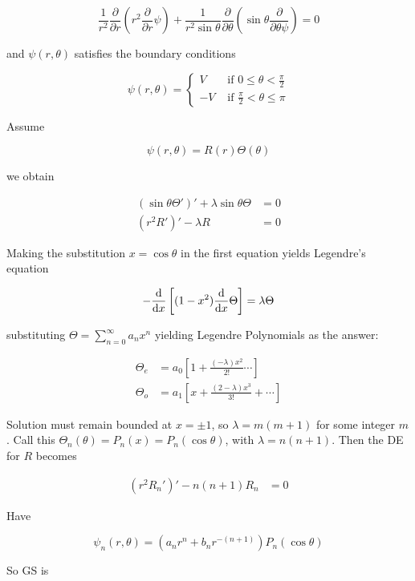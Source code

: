\documentclass[a4paper]{article}
\begin{document}
\[ \frac{1}{r^{2}} \frac{\partial }{\partial r} \left(  r^{2}  \frac{\partial }{\partial r} \psi     \right) + \frac{1}{r^{2} \sin \theta}  \frac{\partial }{\partial \theta} \left(  \sin \theta \frac{\partial }{\partial \theta \psi }   \right) = 0    \]

and $ \psi(r,\theta) $ satisfies the boundary conditions

\[ \psi(r,\theta) = \begin{cases} V  & \text{ if } 0 \leq \theta < \frac{\pi}{2} \\ -V & \text{ if } \frac{\pi}{2} < \theta \leq \pi \end{cases} \]

Assume 

\[ \psi(r,\theta) = R(r) \Theta(\theta) \]

we obtain 

\begin{align*}
(\sin \theta \Theta'  )' + \lambda \sin \theta \Theta & = 0 \\
 (r^{2} R' )' - \lambda R & = 0 
\end{align*}

Making the substitution $ x = \cos \theta $ in the first equation yields Legendre's equation

\[ - \frac{\mathrm{d} }{\mathrm{d} x}  \left[   (1-x^{2}) \frac{\mathrm{d} }{\mathrm{d} x}  \Theta \right]   = \lambda \Theta \]

substituting  $ \Theta = \sum_{n=0}^{\infty} a_{n} x^{n}  $ yielding Legendre Polynomials as the answer:

\begin{align*}
\Theta_{e} & = a_{0}  \left[  1 + \frac{(-\lambda)x^{2}}{2!} \cdots  \right]   \\
\Theta_{o} & = a_{1} \left[   x + \frac{(2 - \lambda) x^{3} }{3!} + \cdots \right]  
\end{align*}

Solution must remain bounded at $ x = \pm 1 $, so $ \lambda = m(m+1) $ for some integer $ m $. Call this  $ \Theta_{n}(\theta) = P_{n}(x) = P_{n} (\cos \theta )  $, with $ \lambda= n(n+1) $. Then the DE for $ R $ becomes


\begin{align*}
(r^{2} R_{n}' )' - n(n+1) R_{n} & = 0 
\end{align*}

Have

\[ \psi_{n} (r,\theta) = (a_{n} r^{n}  + b_{n} r^{-(n+1)}    ) P_{n} (\cos \theta)   \]

So GS is
\end{document}

